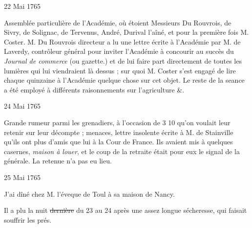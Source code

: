                      \begin{diary}{22 Mai 1765}{}

                         Assemblée particulière de l'Académie, où étoient
                           Messieurs
                           Du Rouvrois, de Sivry, de
                           Solignac, de
                              Tervenus, André,
                              Durival l'aîné, et pour
                           la première fois M. Coster.
                              M. Du Rouvrois
                           directeur a lu une lettre écrite à l'Académie
                           par M. de Laverdy, contrôleur général pour inviter l'Académie à concourir au succès du \emph{Journal
                              de commerce} (ou gazette.) et de lui faire part
                           directement de toutes les lumières qui lui
                           viendraient là dessus ; sur quoi M.
                              Coster s'est
                           engagé de lire chaque quinzaine à l'Académie
                           quelque chose sur cet objet. Le reste de la
                           seance a été employé à différents
                           raisonnements
                           sur l'agriculture \&. \bigskip


                     \end{diary}
                     \begin{diary}{24 Mai 1765}{}

                         Grande rumeur parmi les grenadiers, à
                           l'occasion de 3 10 qu'on
                           voulait leur retenir sur
                           leur décompte ; menaces, lettre insolente écrite
                           à M. de Stainville qu'ils ont
                           plus d'amis que lui
                           à la Cour de France. Ils avaient mis à quelques
                           casernes, \emph{maison à louer}, et le coup de la
                           retraite était pour eux le signal de la générale.
                           La retenue n'a pas eu lieu. \bigskip


                     \end{diary}
                     \begin{diary}{25 Mai 1765}{}

                         J'ai dîné chez
                           M. l'éveque de Toul à sa maison
                           de Nancy. \bigskip


                         Il a plu la nuit \sout{dernière} du 23 au 24 après une assez longue
                           sécheresse, qui faisait souffrir les prés. \bigskip


                     \end{diary}
